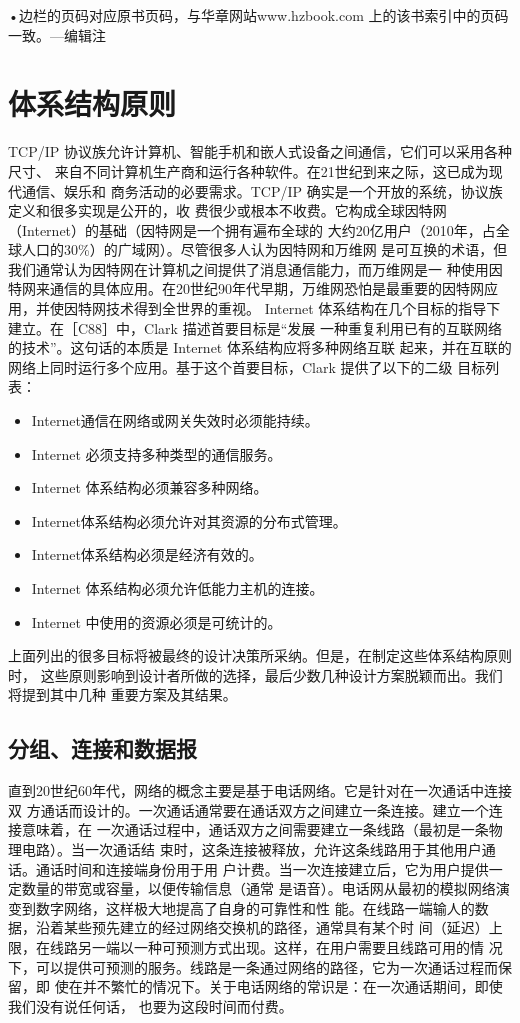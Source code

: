 •边栏的页码对应原书页码，与华章网站www.hzbook.com 上的该书索引中的页码一致。—编辑注


\section{体系结构原则}
TCP/IP 协议族允许计算机、智能手机和嵌人式设备之间通信，它们可以采用各种尺寸、
来自不同计算机生产商和运行各种软件。在21世纪到来之际，这已成为现代通信、娱乐和
商务活动的必要需求。TCP/IP 确实是一个开放的系统，协议族定义和很多实现是公开的，收
费很少或根本不收费。它构成全球因特网（Internet）的基础（因特网是一个拥有遍布全球的
大约20亿用户（2010年，占全球人口的30\%）的广域网）。尽管很多人认为因特网和万维网
是可互换的术语，但我们通常认为因特网在计算机之间提供了消息通信能力，而万维网是一
种使用因特网来通信的具体应用。在20世纪90年代早期，万维网恐怕是最重要的因特网应
用，并使因特网技术得到全世界的重视。
Internet 体系结构在几个目标的指导下建立。在［C88］中，Clark 描述首要目标是“发展
一种重复利用已有的互联网络的技术”。这句话的本质是 Internet 体系结构应将多种网络互联
起来，并在互联的网络上同时运行多个应用。基于这个首要目标，Clark 提供了以下的二级
目标列表：
\begin{itemize}
    \item Internet通信在网络或网关失效时必须能持续。
    \item Internet 必须支持多种类型的通信服务。
    \item Internet 体系结构必须兼容多种网络。
    \item Internet体系结构必须允许对其资源的分布式管理。
    \item Internet体系结构必须是经济有效的。
    \item Internet 体系结构必须允许低能力主机的连接。
    \item Internet 中使用的资源必须是可统计的。
\end{itemize}
上面列出的很多目标将被最终的设计决策所采纳。但是，在制定这些体系结构原则时，
这些原则影响到设计者所做的选择，最后少数几种设计方案脱颖而出。我们将提到其中几种
重要方案及其结果。
\subsection{分组、连接和数据报}
直到20世纪60年代，网络的概念主要是基于电话网络。它是针对在一次通话中连接双
方通话而设计的。一次通话通常要在通话双方之间建立一条连接。建立一个连接意味着，在
一次通话过程中，通话双方之间需要建立一条线路（最初是一条物理电路）。当一次通话结
束时，这条连接被释放，允许这条线路用于其他用户通话。通话时间和连接端身份用于用
户计费。当一次连接建立后，它为用户提供一定数量的带宽或容量，以便传输信息（通常
是语音）。电话网从最初的模拟网络演变到数字网络，这样极大地提高了自身的可靠性和性
能。在线路一端输人的数据，沿着某些预先建立的经过网络交换机的路径，通常具有某个时
间（延迟）上限，在线路另一端以一种可预测方式出现。这样，在用户需要且线路可用的情
况下，可以提供可预测的服务。线路是一条通过网络的路径，它为一次通话过程而保留，即
使在并不繁忙的情况下。关于电话网络的常识是：在一次通话期间，即使我们没有说任何话，
也要为这段时间而付费。

